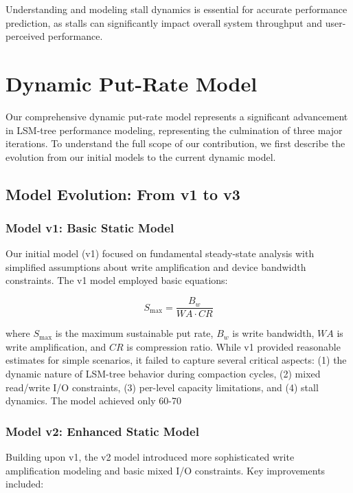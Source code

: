 \documentclass[11pt]{article}
\begin{document}
Understanding and modeling stall dynamics is essential for accurate performance prediction, as stalls can significantly impact overall system throughput and user-perceived performance.

\section{Dynamic Put-Rate Model}
\label{sec:dynamic_model}

Our comprehensive dynamic put-rate model represents a significant advancement in LSM-tree performance modeling, representing the culmination of three major iterations. To understand the full scope of our contribution, we first describe the evolution from our initial models to the current dynamic model.

\subsection{Model Evolution: From v1 to v3}

\subsubsection{Model v1: Basic Static Model}
Our initial model (v1) focused on fundamental steady-state analysis with simplified assumptions about write amplification and device bandwidth constraints. The v1 model employed basic equations:

\begin{equation}
S_{\text{max}} = \frac{B_w}{WA \cdot CR}
\end{equation}

where $S_{\text{max}}$ is the maximum sustainable put rate, $B_w$ is write bandwidth, $WA$ is write amplification, and $CR$ is compression ratio. While v1 provided reasonable estimates for simple scenarios, it failed to capture several critical aspects: (1) the dynamic nature of LSM-tree behavior during compaction cycles, (2) mixed read/write I/O constraints, (3) per-level capacity limitations, and (4) stall dynamics. The model achieved only 60-70%

\subsubsection{Model v2: Enhanced Static Model}
Building upon v1, the v2 model introduced more sophisticated write amplification modeling and basic mixed I/O constraints. Key improvements included:
\end{document}
